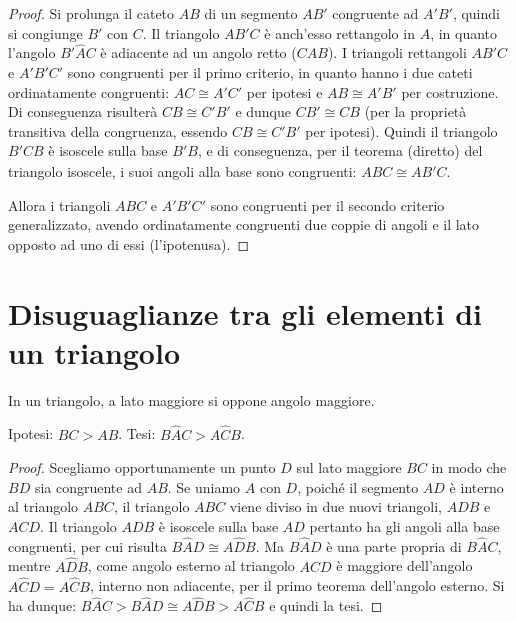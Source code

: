 \begin{proof}
Si prolunga il cateto $AB$ di un segmento $AB'$ congruente ad $A'B'$, quindi si congiunge $B'$ con $C$. Il triangolo $AB'C$ è anch'esso rettangolo in $A$, in quanto l'angolo $B'\widehat{A}C$ è adiacente ad un angolo retto ($C\widehat{A}B$). I triangoli rettangoli $AB'C$ e $A'B'C'$ sono congruenti per il primo criterio, in quanto hanno i due cateti ordinatamente congruenti: $AC\cong A'C'$ per ipotesi e $AB\cong A'B'$ per costruzione. Di conseguenza risulterà $CB\cong C'B'$ e dunque $CB'\cong CB$ (per la proprietà transitiva della congruenza, essendo $CB\cong C'B'$ per ipotesi). Quindi il triangolo $B'CB$ è isoscele sulla base $B'B$, e di conseguenza, per il teorema (diretto) del triangolo isoscele, i suoi angoli alla base sono congruenti: $A\widehat{B}C\cong A\widehat{B'}C$.

Allora i triangoli $ABC$ e $A'B'C'$ sono congruenti per il secondo criterio generalizzato, avendo ordinatamente congruenti due coppie di angoli e il lato opposto ad uno di essi (l'ipotenusa).
\end{proof}

\section{Disuguaglianze tra gli elementi di un triangolo}

\begin{teorema}
In un triangolo, a lato maggiore si oppone angolo maggiore.
\end{teorema}

\noindent Ipotesi: $BC>AB$. Tesi: $B\widehat{A}C>A\widehat{C}B$.

\begin{proof}
Scegliamo opportunamente un punto $D$ sul lato maggiore $BC$ in modo che $BD$ sia congruente ad $AB$. Se uniamo $A$ con $D$, poiché il segmento $AD$ è interno al triangolo $ABC$, il triangolo $ABC$ viene diviso in due nuovi triangoli, $ADB$ e $ACD$. Il triangolo $ADB$ è isoscele sulla base $AD$ pertanto ha gli angoli alla base congruenti, per cui risulta $B\widehat{A}D\cong A\widehat{D}B$. Ma $B\widehat{A}D$ è una parte propria di $B\widehat{A}C$, mentre $A\widehat{D}B$, come angolo esterno al triangolo $ACD$ è maggiore dell'angolo $A\widehat{C}D=A\widehat{C}B$, interno non adiacente, per il primo teorema dell'angolo esterno. Si ha dunque: $B\widehat{A}C>B\widehat{A}D\cong A\widehat{D}B>A\widehat{C}B$ e quindi la tesi.
\end{proof}


